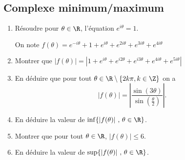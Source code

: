 \subsection{Complexe minimum/maximum}


\begin{exercice}
\begin{enumerate}
\item Résoudre pour $\theta\in \R$, l'équation $e^{i\theta}=1$.

On note $f(\theta) = e^{-i \theta} +1 +e^{i \theta}+e^{2i \theta}+e^{3i \theta}+e^{4i \theta}$
\item Montrer que $|f(\theta)|=\left| 1+e^{i \theta}+e^{i2 \theta}+e^{i3 \theta}+e^{4i \theta}+e^{5i \theta}\right|$
\item En déduire que pour tout $\theta \in \R\setminus\{ 2k\pi , k \in \Z\}$ on a 
$$\left| f(\theta)\right| = \left|\frac{\sin(3\theta)}{ \sin(\frac{\theta}{2})}\right|.$$
\item En déduire la valeur de  $\inf\{ \left| f(\theta)\right|\, ,\,  \theta \in \R \}$. 
\item Montrer que pour tout $\theta \in \R$, $ \left| f(\theta)\right|\leq 6$.
\item En déduire la valeur de $\sup\{ \left| f(\theta)\right|\, ,\,  \theta \in \R\}$. 
\end{enumerate}
\end{exercice}


